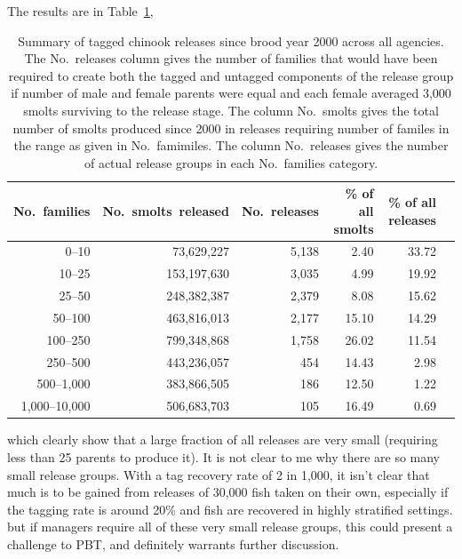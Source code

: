 \documentclass[11pt]{article}
\begin{document}
The results are in Table~\ref{tab:relsummary},
\begin{table}
\caption{Summary of tagged chinook releases since brood year 2000 across all agencies.
The No.~releases column gives the number of families that would have been required to
create both the tagged and untagged components of the release group if number of male and female parents were equal and each female
averaged 3,000 smolts surviving to the release stage. The column No.~smolts gives the total number of smolts produced since 2000
in releases requiring number of familes in the range as given in No.~famimiles.  The column No.~releases gives the number of 
actual release groups in each No.~families category. \label{tab:relsummary}}
\begin{center}
\begin{tabular}{rrrrrr}
\hline\hline
No.~families  &  No.~smolts~released  &  No.~releases  &  \% of all smolts  &  \% of all releases \\ \hline
0--10  &   73,629,227  &  5,138  &  2.40  &  33.72\\
10--25  &  153,197,630  &  3,035  &  4.99  &  19.92\\
25--50  &  248,382,387  &  2,379  &  8.08  &  15.62\\
50--100  &  463,816,013  &  2,177  &  15.10  &  14.29\\
100--250  &  799,348,868  &  1,758  &  26.02  &  11.54\\
250--500  &  443,236,057  &    454  &  14.43  &  2.98\\
500--1,000  &  383,866,505  &    186  &  12.50  &  1.22\\
1,000--10,000  &  506,683,703  &    105  &  16.49  &  0.69\\\hline
\end{tabular}
\end{center}
\end{table}
which clearly show that a large fraction of all releases are very small (requiring less than 25 parents to produce it).
It is not clear to me why there are so many small release groups. With a tag recovery rate
of 2 in 1,000, it isn't clear that much is to be gained from releases of 30,000 fish taken on their own, especially if the
tagging rate is around 20\% and fish are recovered in highly stratified settings.  but if managers require all of these very small release
groups, this could present a challenge to PBT, and definitely warrants further discussion.







 
\end{document}
